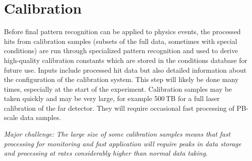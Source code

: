 \documentclass[../main-v1.tex]{subfiles}
\begin{document}
\section{Calibration }

Before final pattern recognition can be applied to physics events,  the processed hits from calibration samples (subsets of the full data, sometimes with special conditions) are run through specialized pattern recognition and used to derive high-quality calibration constants which are stored in the conditions database for future use.  Inputs include processed hit data but also detailed information about the configuration of the calibration system.  This step will likely be done many times, especially at the start of the experiment. Calibration samples may be taken quickly and may be very large, for example 500\,TB for a full laser calibration of the far detector. They will require occasional fast processing of PB-scale data samples. 

{\it Major challenge: The large size of some calibration samples means that fast processing for monitoring and fast application will require peaks in data storage and processing at rates considerably higher than normal data taking.}

%
%
\end{document}
